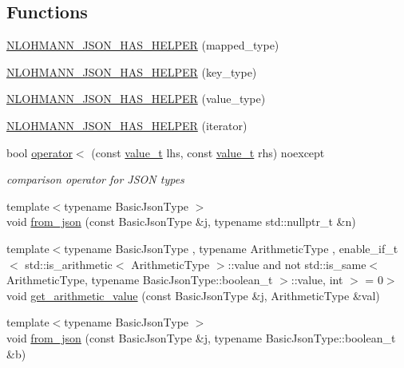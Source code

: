 \subsection*{Functions}
\begin{DoxyCompactItemize}
\item 
\hyperlink{namespacenlohmann_1_1detail_a7b2601c238073c43a07862768b319cf8}{N\+L\+O\+H\+M\+A\+N\+N\+\_\+\+J\+S\+O\+N\+\_\+\+H\+A\+S\+\_\+\+H\+E\+L\+P\+ER} (mapped\+\_\+type)
\item 
\hyperlink{namespacenlohmann_1_1detail_ad19328f0c4ffe2890ecafb7c89e0355b}{N\+L\+O\+H\+M\+A\+N\+N\+\_\+\+J\+S\+O\+N\+\_\+\+H\+A\+S\+\_\+\+H\+E\+L\+P\+ER} (key\+\_\+type)
\item 
\hyperlink{namespacenlohmann_1_1detail_af3e900eb1e0b107c812f7babbb94e69e}{N\+L\+O\+H\+M\+A\+N\+N\+\_\+\+J\+S\+O\+N\+\_\+\+H\+A\+S\+\_\+\+H\+E\+L\+P\+ER} (value\+\_\+type)
\item 
\hyperlink{namespacenlohmann_1_1detail_a6648328c4b1466fdc48f1fcfbff23e2f}{N\+L\+O\+H\+M\+A\+N\+N\+\_\+\+J\+S\+O\+N\+\_\+\+H\+A\+S\+\_\+\+H\+E\+L\+P\+ER} (iterator)
\item 
bool \hyperlink{namespacenlohmann_1_1detail_a09169efff3bd1771fff29bd92cea19e0}{operator$<$} (const \hyperlink{namespacenlohmann_1_1detail_a1ed8fc6239da25abcaf681d30ace4985}{value\+\_\+t} lhs, const \hyperlink{namespacenlohmann_1_1detail_a1ed8fc6239da25abcaf681d30ace4985}{value\+\_\+t} rhs) noexcept
\begin{DoxyCompactList}\small\item\em comparison operator for J\+S\+ON types \end{DoxyCompactList}\item 
{\footnotesize template$<$typename Basic\+Json\+Type $>$ }\\void \hyperlink{namespacenlohmann_1_1detail_a1f0395aad0fe853a4539288749d3a603}{from\+\_\+json} (const Basic\+Json\+Type \&j, typename std\+::nullptr\+\_\+t \&n)
\item 
{\footnotesize template$<$typename Basic\+Json\+Type , typename Arithmetic\+Type , enable\+\_\+if\+\_\+t$<$ std\+::is\+\_\+arithmetic$<$ Arithmetic\+Type $>$\+::value and not std\+::is\+\_\+same$<$ Arithmetic\+Type, typename Basic\+Json\+Type\+::boolean\+\_\+t $>$\+::value, int $>$  = 0$>$ }\\void \hyperlink{namespacenlohmann_1_1detail_a85955b9c6dd31846e4b8e891f78614b6}{get\+\_\+arithmetic\+\_\+value} (const Basic\+Json\+Type \&j, Arithmetic\+Type \&val)
\item 
{\footnotesize template$<$typename Basic\+Json\+Type $>$ }\\void \hyperlink{namespacenlohmann_1_1detail_a58117f225f43d03e3a0a4a6f3d77c9d9}{from\+\_\+json} (const Basic\+Json\+Type \&j, typename Basic\+Json\+Type\+::boolean\+\_\+t \&b)

\end{DoxyCompactItemize}
